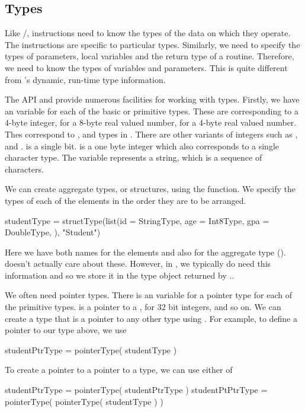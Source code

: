 \subsection{Types}\label{sec:Types}
Like \C/\Cpp, \llvm{} instructions need to know the types of the data
on which they operate.  The instructions are specific to particular
types.  Similarly, we need to specify the types of parameters, local
variables and the return type of a routine.
Therefore, %
we need to know the types of variables and parameters.  This is quite different
from \R's dynamic, run-time type information.

The \llvm{} API and \Rllvm{} provide numerous facilities for working with types.
Firstly, we have an \R{} variable for each of the basic or primitive
types.  These are  corresponding to a $4$-byte
integer,  for a $8$-byte real valued number,
 for a $4$-byte real valued number.  Thes correspond
to ,  and  types in \C. There
are other variants of integers such as ,
 and .   is a single
bit.  is a one byte integer which also
corresponds to a single character type.
The  variable represents
a string, which is a sequence of characters.

We can create aggregate types, or structures, using
the  function.
We specify the types of each of the elements in the order
they are to be arranged. 
\begin{RCode}
studentType = structType(list(id = StringType,
                              age = Int8Type,
                              gpa = DoubleType,
                             ),  "Student")  
\end{RCode}
Here we have both names for the elements and also for the aggregate
type ().  \llvm{} doesn't actually care about
these. However, in \R{}, we typically do need this information and so
we store it in the type object returned by ..


We often need pointer types.  There is an \R{} variable for a pointer
type for each of the primitive types.  is a
pointer to a ,  for 32 bit integers,
and so on.  We can create a type that is a pointer to  any other
type using .
For example, to define a pointer to our   type above,
we use
\begin{RCode}
studentPtrType = pointerType( studentType )  
\end{RCode}
To create a pointer to a pointer to a  type,
we can use either of 
\begin{RCode}
studentPtrType = pointerType( studentPtrType )  
studentPtPtrType = pointerType( pointerType( studentType )  )
\end{RCode}


